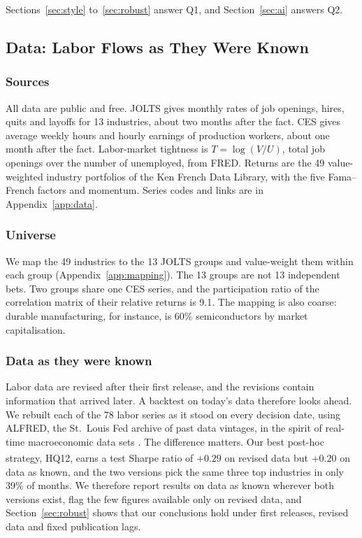 \documentclass[11pt,letterpaper]{article}
\newcommand{\ph}{\textsuperscript{\dag}}
\begin{document}
\vspace{0.3cm}


Sections~\ref{sec:style} to~\ref{sec:robust} answer Q1, and
Section~\ref{sec:ai} answers Q2.
\subsection{Data: Labor Flows as They Were Known}\label{sec:data}

\subsubsection{Sources}
All data are public and free. JOLTS gives monthly rates of job openings, hires,
quits and layoffs for 13 industries, about two months after the fact. CES gives
average weekly hours and hourly earnings of production workers, about one month
after the fact. Labor-market tightness is $T=\log(V/U)$, total job openings over
the number of unemployed, from FRED. Returns are the 49 value-weighted industry
portfolios of the Ken French Data Library, with the five Fama--French factors
and momentum. Series codes and links are in Appendix~\ref{app:data}.

\subsubsection{Universe}
We map the 49 industries to the 13 JOLTS groups and value-weight them within
each group (Appendix~\ref{app:mapping}). The 13 groups are not 13 independent
bets. Two groups share one CES series, and the participation ratio of the
correlation matrix of their relative returns is 9.1. The mapping is also
coarse: durable manufacturing, for instance, is 60\% semiconductors by market
capitalisation.

\subsubsection{Data as they were known}
Labor data are revised after their first release, and the revisions contain
information that arrived later. A backtest on today's data therefore looks
ahead. We rebuilt each of the 78 labor series as it stood on every decision
date, using ALFRED, the St.~Louis Fed archive of past data vintages, in the
spirit of real-time macroeconomic data sets \citep{croushore2001}. The
difference matters. Our best post-hoc strategy, HQ12\ph, earns a test Sharpe
ratio of $+0.29$ on revised data but $+0.20$ on data as known, and the two
versions pick the same three top industries in only 39\% of months. We
therefore report results on data as known wherever both versions exist, flag the
few figures available only on revised data, and
Section~\ref{sec:robust} shows that our conclusions hold under first releases,
revised data and fixed publication lags.
\end{document}
